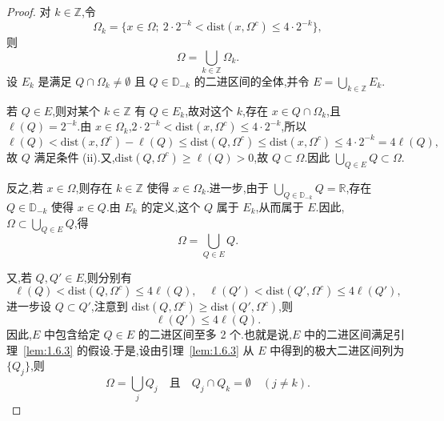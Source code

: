 \begin{proof}
对 $k \in \mathbb{Z}$,令
\begin{equation*}
\Omega_{k} = \{x \in \Omega;\ 2\cdot 2^{-k} < \mathrm{dist}(x, \Omega^{c}) \leq 4\cdot 2^{-k}\},
\end{equation*}
则
\begin{equation*}
\Omega = \bigcup_{k \in \mathbb{Z}}\Omega_{k}.
\end{equation*}
设 $E_{k}$ 是满足 $Q \cap \Omega_{k} \neq \emptyset$ 且 $Q \in \mathbb{D}_{-k}$ 的二进区间的全体,并令 $E = \bigcup_{k \in \mathbb{Z}}E_{k}$.

若 $Q \in E$,则对某个 $k \in \mathbb{Z}$ 有 $Q \in E_{k}$,故对这个 $k$,存在 $x \in Q \cap \Omega_{k}$,且 $\ell(Q) = 2^{-k}$.由 $x \in \Omega_{k}$,$2\cdot 2^{-k} < \mathrm{dist}(x, \Omega^{c}) \leq 4\cdot 2^{-k}$,所以
\begin{equation*}
\ell(Q) < \mathrm{dist}(x, \Omega^{c}) - \ell(Q) \leq \mathrm{dist}(Q, \Omega^{c}) \leq \mathrm{dist}(x, \Omega^{c}) \leq 4\cdot 2^{-k} = 4\ell(Q),
\end{equation*}
故 $Q$ 满足条件 (ii).又,$\mathrm{dist}(Q, \Omega^{c}) \geq \ell(Q) > 0$,故 $Q \subset \Omega$.因此 $\bigcup_{Q \in E}Q \subset \Omega$.

反之,若 $x \in \Omega$,则存在 $k \in \mathbb{Z}$ 使得 $x \in \Omega_{k}$.进一步,由于 $\bigcup_{Q \in \mathbb{D}_{-k}}Q = \mathbb{R}$,存在 $Q \in \mathbb{D}_{-k}$ 使得 $x \in Q$.由 $E_{k}$ 的定义,这个 $Q$ 属于 $E_{k}$,从而属于 $E$.因此,$\Omega \subset \bigcup_{Q \in E}Q$,得
\begin{equation*}
\Omega = \bigcup_{Q \in E}Q.
\end{equation*}

又,若 $Q, Q' \in E$,则分别有
\begin{equation*}
\ell(Q) < \mathrm{dist}(Q, \Omega^{c}) \leq 4\ell(Q), \quad \ell(Q') < \mathrm{dist}(Q', \Omega^{c}) \leq 4\ell(Q'),
\end{equation*}
进一步设 $Q \subset Q'$,注意到 $\mathrm{dist}(Q, \Omega^{c}) \geq \mathrm{dist}(Q', \Omega^{c})$,则
\begin{equation*}
\ell(Q') \leq 4\ell(Q).
\end{equation*}
因此,$E$ 中包含给定 $Q \in E$ 的二进区间至多 2 个.也就是说,$E$ 中的二进区间满足引理~\ref{lem:1.6.3} 的假设.于是,设由引理~\ref{lem:1.6.3} 从 $E$ 中得到的极大二进区间列为 $\{Q_{j}\}$,则
\begin{equation*}
\Omega = \bigcup_{j}Q_{j} \quad \text{且} \quad Q_{j} \cap Q_{k} = \emptyset \quad (j \neq k).
\end{equation*}


\end{proof}
